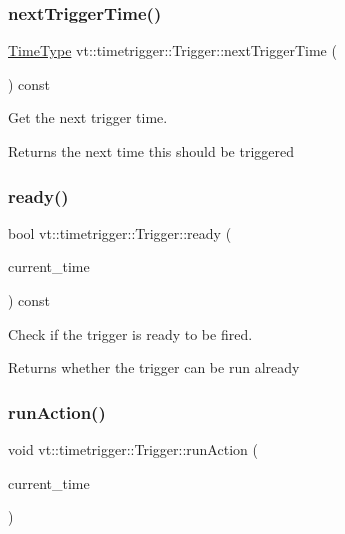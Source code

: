 \subsubsection{\texorpdfstring{next\+Trigger\+Time()}{nextTriggerTime()}}
{\footnotesize\ttfamily \hyperlink{namespacevt_a876a9d0cd5a952859c72de8a46881442}{Time\+Type} vt\+::timetrigger\+::\+Trigger\+::next\+Trigger\+Time (\begin{DoxyParamCaption}{ }\end{DoxyParamCaption}) const\hspace{0.3cm}{\ttfamily [inline]}}



Get the next trigger time. 

\begin{DoxyReturn}{Returns}
the next time this should be triggered 
\end{DoxyReturn}
\mbox{\label{structvt_1_1timetrigger_1_1_trigger_af00027850254b42fbcc2f5fde829b386}} 
\subsubsection{\texorpdfstring{ready()}{ready()}}
{\footnotesize\ttfamily bool vt\+::timetrigger\+::\+Trigger\+::ready (\begin{DoxyParamCaption}\item[{\hyperlink{namespacevt_a876a9d0cd5a952859c72de8a46881442}{Time\+Type}}]{current\+\_\+time }\end{DoxyParamCaption}) const\hspace{0.3cm}{\ttfamily [inline]}}



Check if the trigger is ready to be fired. 

\begin{DoxyReturn}{Returns}
whether the trigger can be run already 
\end{DoxyReturn}
\mbox{\label{structvt_1_1timetrigger_1_1_trigger_a44688f64be94b9c821768b55a3a236f7}} 
\subsubsection{\texorpdfstring{run\+Action()}{runAction()}}
{\footnotesize\ttfamily void vt\+::timetrigger\+::\+Trigger\+::run\+Action (\begin{DoxyParamCaption}\item[{\hyperlink{namespacevt_a876a9d0cd5a952859c72de8a46881442}{Time\+Type}}]{current\+\_\+time }\end{DoxyParamCaption})\hspace{0.3cm}{\ttfamily [inline]}}



